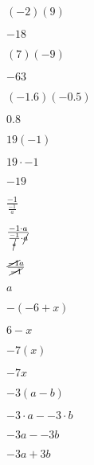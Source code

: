 \documentclass{article}
\begin{document}
\begin{enumerate}[start=28]
    \item $(-2)(9)$
    \begin{center}
        $-18$
    \end{center}

    \item $(7)(-9)$
    \begin{center}
        \item $-63$
    \end{center}

    \item $(-1.6)(-0.5)$
    \begin{center}
        \item $0.8$    
    \end{center}

    \item $19(-1)$
    \begin{center}
        \item $19 \cdot -1$
        \item $-19$
    \end{center}

    \item $\frac{-1}{\frac{-1}{a}}$
    \begin{center}
        \item $\frac{-1 \cdot a}{\frac{-1}{\cancel{a}} \cdot \cancel{a}}$
        \item $\frac{\cancel{-1}a}{\cancel{-1}}$
        \item $a$
    \end{center}

    \item $-(-6 + x)$
    \begin{center}
        \item $6 - x$    
    \end{center}

    \item $-7(x)$
    \begin{center}
        \item $-7x$    
    \end{center}

    \item $-3(a - b)$
    \begin{center}
        \item $-3 \cdot a - -3 \cdot b$
        \item $-3a - -3b$
        \item $-3a + 3b$
    \end{center}


\end{enumerate}
\end{document}
